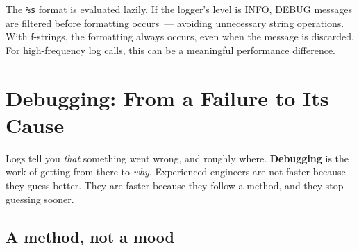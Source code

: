 \begin{codebox}[short]

\begin{Shaded}
\begin{Highlighting}[]
 \OperatorTok{+} 

\SpecialCharTok{\{}\SpecialCharTok{\}}\NormalTok{)}

\end{Highlighting}
\end{Shaded}

\end{codebox}

\noindent{}The \texttt{\%s} format is evaluated lazily. If the logger's level is INFO, DEBUG messages are filtered before formatting occurs~--- avoiding unnecessary string operations. With f-strings, the formatting always occurs, even when the message is discarded. For high-frequency log calls, this can be a meaningful performance difference.

\setcounter{section}{9}
\section{Debugging: From a Failure to Its Cause}\label{16-logging-error-handling:1610-debugging-from-a-failure-to-its-cause}

Logs tell you \emph{that} something went wrong, and roughly where. \textbf{Debugging} is the work of getting from there to \emph{why}. Experienced engineers are not faster because they guess better. They are faster because they follow a method, and they stop guessing sooner.

\subsection*{A method, not a mood}\label{16-logging-error-handling:a-method-not-a-mood}

